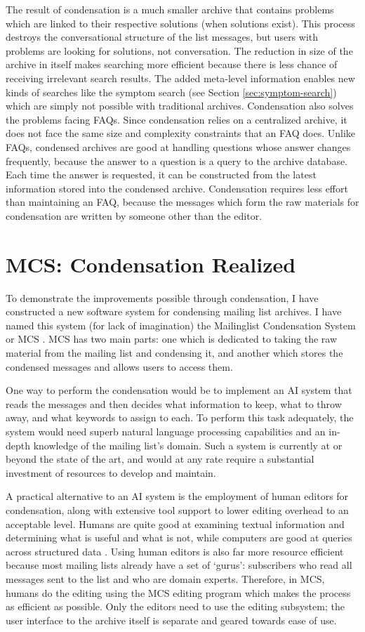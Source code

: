 The result of condensation is a much smaller archive that contains problems
which are linked to their respective solutions (when solutions exist). This
process destroys the conversational structure of the list messages, but users
with problems are looking for solutions, not conversation. The reduction in
size of the archive in itself makes searching more efficient because there is
less chance of receiving irrelevant search results. The added meta-level
information enables new kinds of searches like the symptom search (see Section
\ref{sec:symptom-search}) which are simply not possible with traditional
archives. Condensation also solves the problems facing FAQs. Since condensation
relies on a centralized archive, it does not face the same size and complexity
constraints that an FAQ does. Unlike FAQs, condensed archives are good at
handling questions whose answer changes frequently, because the answer to a
question is a query to the archive database. Each time the answer is requested,
it can be constructed from the latest information stored into the condensed
archive. Condensation requires less effort than maintaining an FAQ, because the
messages which form the raw materials for condensation are written by someone
other than the editor.

\section{MCS: Condensation Realized}
To demonstrate the improvements possible through condensation, I have
constructed a new software system for condensing mailing list archives. I have
named this system (for lack of imagination) the Mailinglist Condensation System
or MCS \cite{mcs-website}. MCS has two main parts: one which is dedicated to
taking the raw material from the mailing list and condensing it, and another
which stores the condensed messages and allows users to access them.

One way to perform the condensation would be to implement an AI system that
reads the messages and then decides what information to keep, what to throw
away, and what keywords to assign to each. To perform this task adequately, the
system would need superb natural language processing capabilities and an
in-depth knowledge of the mailing list's domain. Such a system is currently at
or beyond the state of the art, and would at any rate require a substantial
investment of resources to develop and maintain.

A practical alternative to an AI system is the employment of human editors for
condensation, along with extensive tool support to lower editing overhead to an
acceptable level. Humans are quite good at examining textual information and
determining what is useful and what is not, while computers are good at queries
across structured data \cite{Brooks:1996:CST}. Using human editors is also far
more resource efficient because most mailing lists already have a set of
`gurus': subscribers who read all messages sent to the list and who are domain
experts. Therefore, in MCS, humans do the editing using the MCS editing program
which makes the process as efficient as possible. Only the editors need to use
the editing subsystem; the user interface to the archive itself is separate and
geared towards ease of use.

